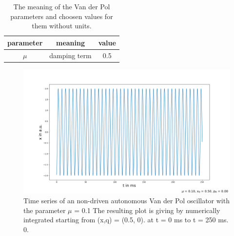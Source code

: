 \documentclass[oneside,10pt,a4paper]{report}
\begin{document}
			\begin{table}[H]
			\centering
			\caption{The meaning of the Van der Pol parameters and choosen values for them without units.}
			\label{tab: vdp_ungetriebene_parameter}
			\begin{tabular}{c c c}
				\toprule
				parameter & meaning & value\\
				\midrule
				$\mu$ & damping term & 0.5\\
				\bottomrule
			\end{tabular}
		\end{table}
		
			\begin{figure}[H]
			\centering
			\includegraphics[scale=0.4]{vdp_unforced_x.png}
			\caption{Time series of an non-driven autonomous Van der Pol oscillator with the parameter $\mu$ = 0.1 The resulting plot is giving by numerically integrated starting from (x,q) = (0.5, 0)\cite{Nonlinear_Dynamic_and_chaos_book}. at t = 0 ms to t = 250 ms. 0.}
			\label{fig: vdp_unforced_x}
		\end{figure}
		
		
\end{document}
